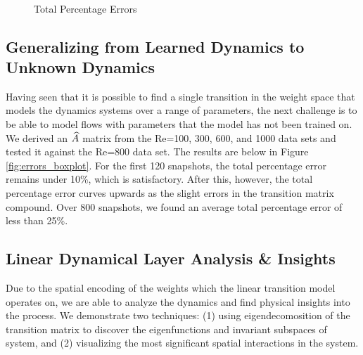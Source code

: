 \begin{figure*}[h] %
	\centering
	\\
	\caption{Total Percentage Errors}
\end{figure*}

\subsection{Generalizing from Learned Dynamics to Unknown Dynamics}\label{sec:generalize}

Having seen that it is possible to find a single transition in the weight space that models the dynamics systems over a range of parameters, the next challenge is to be able to model flows with parameters that the model has not been trained on. We derived an $\widehat{A}$ matrix from the Re=100, 300, 600, and 1000 data sets and tested it against the Re=800 data set. The results are below in Figure \ref{fig:errors_boxplot}. For the first 120 snapshots, the total percentage error remains under 10\%, which is satisfactory. After this, however, the total percentage error curves upwards as the slight errors in the transition matrix compound. Over 800 snapshots, we found an average total percentage error of less than 25\%. %

\subsection{Linear Dynamical Layer Analysis \& Insights}\label{sec:analysis}
Due to the spatial encoding of the weights which the linear transition model operates on, we are able to analyze the dynamics and find physical insights into the process. We demonstrate two techniques: (1) using eigendecomosition of the transition matrix to discover the eigenfunctions and invariant subspaces of system, and (2) visualizing the most significant spatial interactions in the system.

